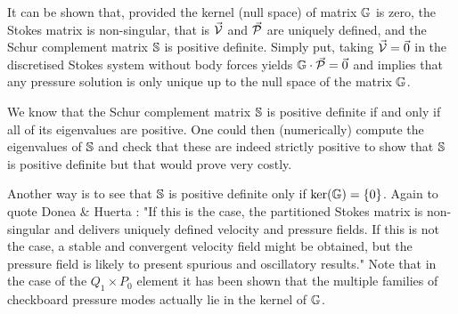 It can be shown that, provided the kernel (null space) of matrix ${\mathbb{G}}$ is zero,
the Stokes matrix is non-singular, that is $\vec{\cal V}$ and $\vec{\cal P}$ 
are uniquely defined, and the Schur complement matrix ${\mathbb{S}}$ is positive definite. 
Simply put, taking $\vec{\cal V}=\vec{0}$ in the discretised Stokes system 
without body forces yields ${\mathbb{G}} \cdot \vec{\cal P}=\vec{0}$ and implies
that any pressure solution is only unique up to the null space of the matrix ${\mathbb{G}}$.

We know that the Schur complement matrix ${\mathbb{S}}$ is positive definite if and only if all of its eigenvalues are positive.
One could then (numerically) compute the eigenvalues of ${\mathbb{S}}$ and check that these are indeed strictly positive
to show that ${\mathbb{S}}$ is positive definite but that would prove very costly. 

Another way is to see that ${\mathbb{S}}$ is positive definite only if $\text{ker}({\mathbb{G}})=\{0\}$.
Again to quote Donea \& Huerta \cite{dohu03}: "If this is the case, the partitioned Stokes matrix  
is non-singular and delivers uniquely defined velocity and pressure fields. If this is not the case, a
stable and convergent velocity field might be obtained, but the pressure field is likely
to present spurious and oscillatory results." 
Note that in the case of the $Q_1 \times P_0$ element it has been shown that the multiple families of 
checkboard pressure modes actually lie in the kernel of ${\mathbb{G}}$. \cite{sagl81a,sagl81b}


